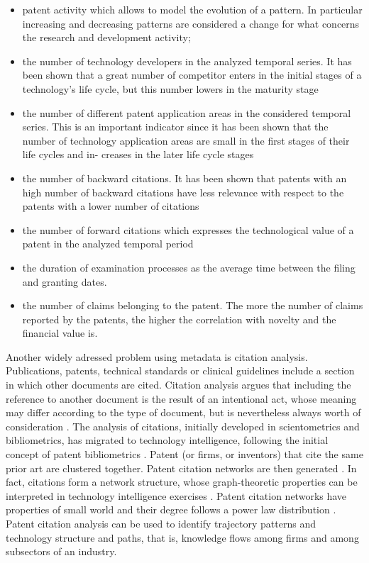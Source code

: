 \documentclass[]{book}
\providecommand{\tightlist}{%
  \setlength{\itemsep}{0pt}\setlength{\parskip}{0pt}}
\theoremstyle{definition}
\theoremstyle{definition}
\theoremstyle{definition}
\theoremstyle{remark}
\begin{document}
\begin{itemize}
\tightlist
\item
  patent activity which allows to model the evolution of a pattern. In
  particular increasing and decreasing patterns are considered a change
  for what concerns the research and development activity;
\item
  the number of technology developers in the analyzed temporal series.
  It has been shown that a great number of competitor enters in the
  initial stages of a technology's life cycle, but this number lowers in
  the maturity stage
\item
  the number of different patent application areas in the considered
  temporal series. This is an important indicator since it has been
  shown that the number of technology application areas are small in the
  first stages of their life cycles and in- creases in the later life
  cycle stages
\item
  the number of backward citations. It has been shown that patents with
  an high number of backward citations have less relevance with respect
  to the patents with a lower number of citations
\item
  the number of forward citations which expresses the technological
  value of a patent in the analyzed temporal period
\item
  the duration of examination processes as the average time between the
  filing and granting dates.
\item
  the number of claims belonging to the patent. The more the number of
  claims reported by the patents, the higher the correlation with
  novelty and the financial value is.
\end{itemize}

Another widely adressed problem using metadata is citation analysis.
Publications, patents, technical standards or clinical guidelines
include a section in which other documents are cited. Citation analysis
argues that including the reference to another document is the result of
an intentional act, whose meaning may differ according to the type of
document, but is nevertheless always worth of consideration
\citep{moed2006citation}. The analysis of citations, initially developed
in scientometrics and bibliometrics, has migrated to technology
intelligence, following the initial concept of patent bibliometrics
\citep{narin1994patent}. Patent (or firms, or inventors) that cite the
same prior art are clustered together. Patent citation networks are then
generated \citep{karki1997patent, erdi2013prediction}. In fact,
citations form a network structure, whose graph-theoretic properties can
be interpreted in technology intelligence exercises
\citep{lee2017knowledge}. Patent citation networks have properties of
small world \citep{cowan2004network} and their degree follows a power
law distribution \citep{chen2004tracing}. Patent citation analysis can
be used to identify trajectory patterns and technology structure and
paths, that is, knowledge flows among firms and among subsectors of an
industry.
\end{document}
